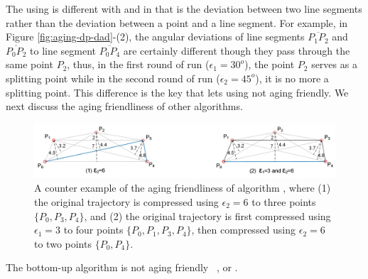 The \dpa using \dad is different with \ped and \sed in that \dad is the deviation between two line segments rather than the deviation between a point and a line segment. For example, in Figure \ref{fig:aging-dp-dad}-(2), the angular deviations of line segments $\overline{P_1P_2}$ and $\overline{P_0P_2}$ to line segment $\overline{P_0P_4}$ are certainly different though they pass through the same point $P_2$, thus, in the first round of run ($\epsilon_1=30^o$), the point $P_2$ serves as a splitting point while in the second round of run ($\epsilon_2=45^o$), it is no more a splitting point. This difference is the key that lets \dpa using \dad not aging friendly.
%
We next discuss the aging friendliness of other algorithms.

\begin{figure}
	\centering
	\includegraphics[scale=0.66]{Figures/Fig-aging-pavlidis.jpg}

	\caption{\small A counter example of the aging friendliness of algorithm \tpa, where (1) the original trajectory is compressed using $\epsilon_2=6$ to three points $\{P_0, P_3, P_4\}$, and (2) the original trajectory is first compressed using $\epsilon_1=3$ to four points $\{P_0, P_1, P_3, P_4\}$, then compressed using $\epsilon_2=6$ to two points $\{P_0, P_4\}$. }
	\vspace{-1ex}
	\label{fig:aging-pavlidis}
\end{figure}


\begin{proposition}
\label{theo-aging-tp}
The bottom-up algorithm \tpa is not aging friendly \wrt~\ped, \sed or \dad.
\end{proposition}

